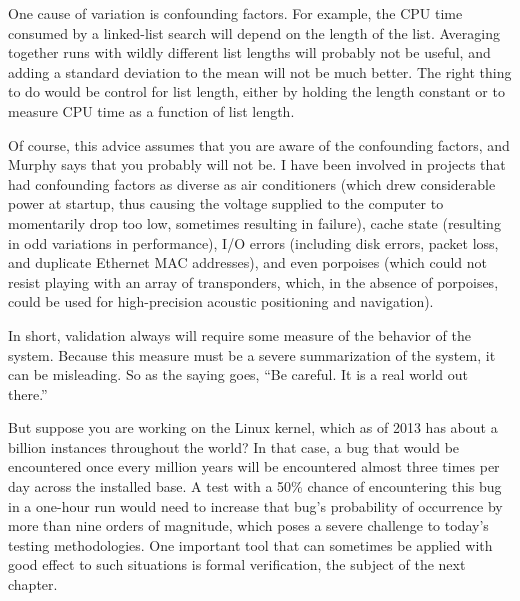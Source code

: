 One cause of variation is confounding factors.
For example, the CPU time consumed by a linked-list search will depend
on the length of the list.
Averaging together runs with wildly different list lengths will
probably not be useful, and adding a standard deviation to the mean
will not be much better.
The right thing to do would be control for list length, either by
holding the length constant or to measure CPU time as a function of
list length.

Of course, this advice assumes that you are aware of the confounding
factors, and Murphy says that you probably will not be.
I have been involved in projects that had confounding factors as
diverse as air conditioners (which drew considerable power at startup,
thus causing the voltage supplied to the computer to momentarily drop
too low, sometimes resulting in failure), cache state (resulting in
odd variations in performance), I/O errors (including disk errors,
packet loss, and duplicate Ethernet MAC addresses), and even
porpoises (which could not resist playing with an array of transponders,
which, in the absence of porpoises, could be
used for high-precision acoustic positioning and navigation).

In short, validation always will require some measure of the behavior of
the system.
Because this measure must be a severe summarization of the system,
it can be misleading.
So as the saying goes, ``Be careful.  It is a real world out there.''

But suppose you are working on the Linux kernel, which as of 2013 has
about a billion instances throughout the world?
In that case, a bug that would be encountered once every million years
will be encountered almost three times per day across the installed
base.
A test with a 50\% chance of encountering this bug in a one-hour run
would need to increase that bug's probability of occurrence by more
than nine orders of magnitude, which poses a severe challenge to
today's testing methodologies.
One important tool that can sometimes be applied with good effect to
such situations is formal verification, the subject of the next chapter.
